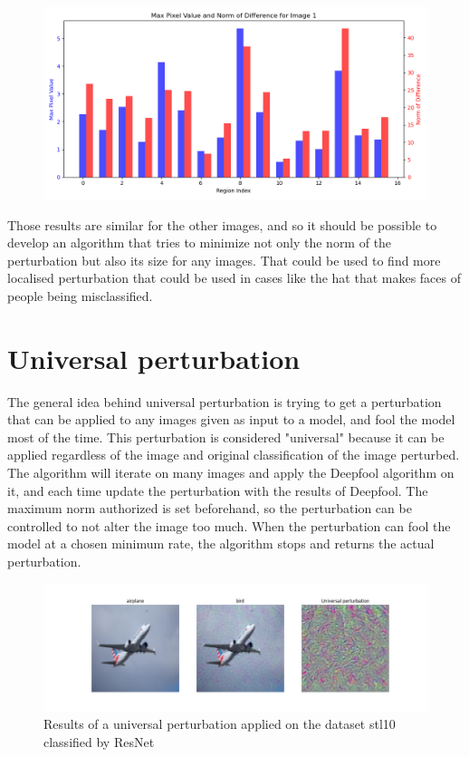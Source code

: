 \documentclass{article}
\begin{document}
\begin{figure}[H]
    \centering
    \includegraphics[width=1\linewidth]{results/max_value_pixel_norm_diff_1.png}
    \caption{}
    \label{fig:max_1}
\end{figure}

Those results are similar for the other images, and so it should be possible to develop an algorithm that tries to minimize not only the norm of the perturbation but also its size for any images. That could be used to find more localised perturbation that could be used in cases like the hat that makes faces of people being misclassified.

\newpage
\section{Universal perturbation}

The general idea behind universal perturbation is trying to get a perturbation that can be applied to any images given as input to a model, and fool the model most of the time. This perturbation is considered "universal" because it can be applied regardless of the image and original classification of the image perturbed.\\

The algorithm will iterate on many images and apply the Deepfool algorithm on it, and each time update the perturbation with the results of Deepfool. The maximum norm authorized is set beforehand, so the perturbation can be controlled to not alter the image too much. When the perturbation can fool the model at a chosen minimum rate, the algorithm stops and returns the actual perturbation.

\begin{figure}[H]
    \centering
    \includegraphics[width=1\linewidth]{results/example_universal_stl10_resnet.png}
    \caption{Results of a universal perturbation applied on the dataset stl10 classified by ResNet}
    \label{fig:universal}
\end{figure}
\end{document}
